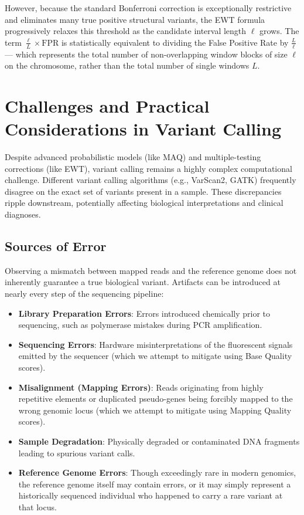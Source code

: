 \documentclass[11pt,a4paper]{article}
\begin{document}
However, because the standard Bonferroni correction is exceptionally restrictive and eliminates many true positive structural variants, the EWT formula progressively relaxes this threshold as the candidate interval length \( \ell \) grows. The term \( \frac{\ell}{L} \times \text{FPR} \) is statistically equivalent to dividing the False Positive Rate by \( \frac{L}{\ell} \) — which represents the total number of non-overlapping window blocks of size \( \ell \) on the chromosome, rather than the total number of single windows \( L \).


\section{Challenges and Practical Considerations in Variant Calling}
Despite advanced probabilistic models (like MAQ) and multiple-testing corrections (like EWT), variant calling remains a highly complex computational challenge. Different variant calling algorithms (e.g., VarScan2, GATK) frequently disagree on the exact set of variants present in a sample. These discrepancies ripple downstream, potentially affecting biological interpretations and clinical diagnoses.

\subsection{Sources of Error}
Observing a mismatch between mapped reads and the reference genome does not inherently guarantee a true biological variant. Artifacts can be introduced at nearly every step of the sequencing pipeline:

\begin{itemize}
    \item \textbf{Library Preparation Errors}: Errors introduced chemically prior to sequencing, such as polymerase mistakes during PCR amplification.
    \item \textbf{Sequencing Errors}: Hardware misinterpretations of the fluorescent signals emitted by the sequencer (which we attempt to mitigate using Base Quality scores).
    \item \textbf{Misalignment (Mapping Errors)}: Reads originating from highly repetitive elements or duplicated pseudo-genes being forcibly mapped to the wrong genomic locus (which we attempt to mitigate using Mapping Quality scores).
    \item \textbf{Sample Degradation}: Physically degraded or contaminated DNA fragments leading to spurious variant calls.
    \item \textbf{Reference Genome Errors}: Though exceedingly rare in modern genomics, the reference genome itself may contain errors, or it may simply represent a historically sequenced individual who happened to carry a rare variant at that locus.
\end{itemize}
\end{document}
